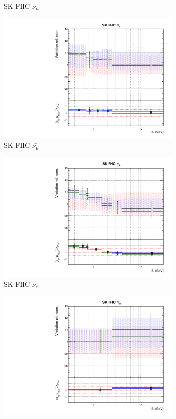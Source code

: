 \begin{figure}
\begin{subfigure}{0.45\textwidth}
  \caption{SK FHC $\nu_{\mu}$}
\end{subfigure}
\begin{subfigure}{0.45\textwidth}
  \centering
  \includegraphics[width=0.75\linewidth]{figs/polydataflux_9}
  \caption{SK FHC $\bar{\nu_{\mu}}$}
\end{subfigure}
\begin{subfigure}{0.45\textwidth}
  \centering
  \includegraphics[width=0.75\linewidth]{figs/polydataflux_10}
  \caption{SK FHC $\nu_e$}
\end{subfigure}
\begin{subfigure}{0.45\textwidth}
  \centering
  \includegraphics[width=0.75\linewidth]{figs/polydataflux_11}

\end{subfigure}
\end{figure}

